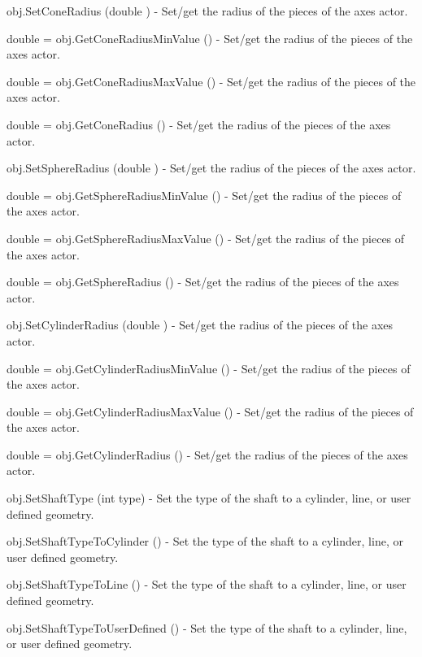 \begin{DoxyItemize}
\item {\ttfamily obj.\-Set\-Cone\-Radius (double )} -\/ Set/get the radius of the pieces of the axes actor.  
\item {\ttfamily double = obj.\-Get\-Cone\-Radius\-Min\-Value ()} -\/ Set/get the radius of the pieces of the axes actor.  
\item {\ttfamily double = obj.\-Get\-Cone\-Radius\-Max\-Value ()} -\/ Set/get the radius of the pieces of the axes actor.  
\item {\ttfamily double = obj.\-Get\-Cone\-Radius ()} -\/ Set/get the radius of the pieces of the axes actor.  
\item {\ttfamily obj.\-Set\-Sphere\-Radius (double )} -\/ Set/get the radius of the pieces of the axes actor.  
\item {\ttfamily double = obj.\-Get\-Sphere\-Radius\-Min\-Value ()} -\/ Set/get the radius of the pieces of the axes actor.  
\item {\ttfamily double = obj.\-Get\-Sphere\-Radius\-Max\-Value ()} -\/ Set/get the radius of the pieces of the axes actor.  
\item {\ttfamily double = obj.\-Get\-Sphere\-Radius ()} -\/ Set/get the radius of the pieces of the axes actor.  
\item {\ttfamily obj.\-Set\-Cylinder\-Radius (double )} -\/ Set/get the radius of the pieces of the axes actor.  
\item {\ttfamily double = obj.\-Get\-Cylinder\-Radius\-Min\-Value ()} -\/ Set/get the radius of the pieces of the axes actor.  
\item {\ttfamily double = obj.\-Get\-Cylinder\-Radius\-Max\-Value ()} -\/ Set/get the radius of the pieces of the axes actor.  
\item {\ttfamily double = obj.\-Get\-Cylinder\-Radius ()} -\/ Set/get the radius of the pieces of the axes actor.  
\item {\ttfamily obj.\-Set\-Shaft\-Type (int type)} -\/ Set the type of the shaft to a cylinder, line, or user defined geometry.  
\item {\ttfamily obj.\-Set\-Shaft\-Type\-To\-Cylinder ()} -\/ Set the type of the shaft to a cylinder, line, or user defined geometry.  
\item {\ttfamily obj.\-Set\-Shaft\-Type\-To\-Line ()} -\/ Set the type of the shaft to a cylinder, line, or user defined geometry.  
\item {\ttfamily obj.\-Set\-Shaft\-Type\-To\-User\-Defined ()} -\/ Set the type of the shaft to a cylinder, line, or user defined geometry.  

\end{DoxyItemize}
